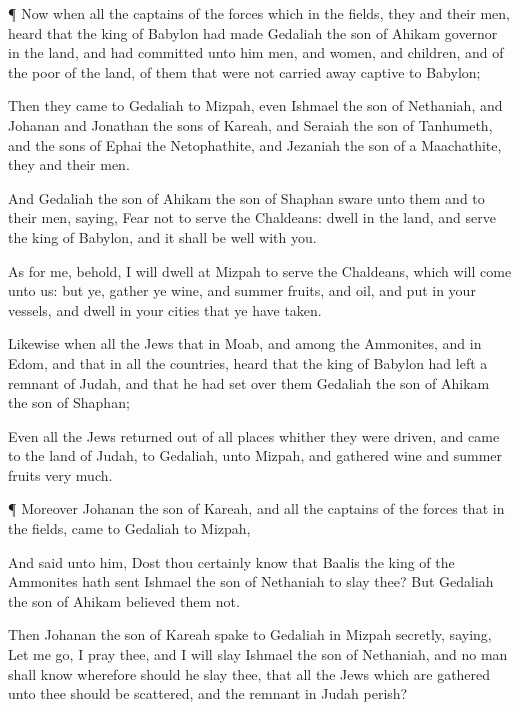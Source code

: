 {\par }{\PP {}¶ Now when all the
captains of the
forces which
{} in the
fields,
{} they and their
men,
heard that the
king of
Babylon had made
Gedaliah the
son of
Ahikam
governor in the
land, and had
committed unto him
men, and
women, and
children, and of the
poor of the
land, of them that were not carried away
captive to
Babylon;

Then they
came to
Gedaliah to
Mizpah, even
Ishmael the
son of
Nethaniah, and
Johanan and
Jonathan the
sons of
Kareah, and
Seraiah the
son of
Tanhumeth, and the
sons of
Ephai the
Netophathite, and
Jezaniah the
son of a
Maachathite, they and their
men.

And
Gedaliah the
son of
Ahikam the
son of
Shaphan
sware unto them and to their
men,
saying,
Fear not to
serve the
Chaldeans: dwell
in the
land, and
serve the
king of
Babylon, and it shall be
well with you.

As for me, behold, I will
dwell at
Mizpah to
serve the
Chaldeans, which will
come unto us: but ye,
gather ye
wine, and summer
fruits, and
oil, and
put
{} in your
vessels, and
dwell in your
cities that ye have
taken.

Likewise when all the
Jews that
{} in
Moab, and among the
Ammonites, and in
Edom, and that
{} in all the
countries,
heard that the
king of
Babylon had
left a
remnant of
Judah, and that he had
set over them
Gedaliah the
son of
Ahikam the
son of
Shaphan;

Even all the
Jews returned
out of all
places whither they were
driven, and
came to the
land of
Judah, to
Gedaliah, unto
Mizpah, and
gathered
wine and summer
fruits
very
much.


\par }{\PP {}¶ Moreover
Johanan the
son of
Kareah, and all the
captains of the
forces that
{} in the
fields,
came to
Gedaliah to
Mizpah,

And
said unto him, Dost thou
certainly
know that
Baalis the
king of the
Ammonites hath
sent
Ishmael the
son of
Nethaniah to
slay thee? But
Gedaliah the
son of
Ahikam
believed them not.

Then
Johanan the
son of
Kareah
spake to
Gedaliah in
Mizpah
secretly,
saying, Let me
go, I pray thee, and I will
slay
Ishmael the
son of
Nethaniah, and no
man shall
know
{} wherefore should he
slay thee, that all the
Jews which are
gathered unto thee should be
scattered, and the
remnant in
Judah
perish?

}
